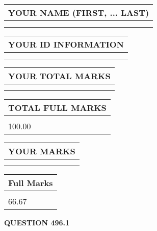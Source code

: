\documentclass{ctexart}
\begin{document}
   
   
   
\newpage 
\setcounter{page}{ 
   496001 } 
   
   
   
   
\noindent\begin{tabular}{|l|}
\hline
YOUR NAME (FIRST, ... LAST)  \\
\hline
 \\ 
 \\ 
\hline
\end{tabular}
\hspace{0.05in} \begin{tabular}{|l|}
\hline
 YOUR   ID   INFORMATION  \\
\hline
 \\ 
 \\ 
\hline
\end{tabular}
   
   
\vspace{0.2in}\noindent\begin{tabular}{|l|}
\hline
YOUR TOTAL MARKS  \\
\hline
 \\ 
 \\ 
\hline
\end{tabular}
\hspace{0.05in} \begin{tabular}{|l|}
\hline
TOTAL FULL MARKS  \\
\hline
 \\ 
100.00 \\
\hline
\end{tabular}
   
   
 \vspace{0.2in}
 
 
 
 
   
   
  
\vspace{0.2in}
  
\noindent\begin{tabular}{|l|}
\hline
 YOUR MARKS  \\
\hline
 \\ 
 \\ 
\hline
\end{tabular}
\hspace{0.05in} \begin{tabular}{|l|}
\hline
 Full Marks  \\
\hline
 \\ 
66.67 \\
\hline
\end{tabular}
{\textbf{\Large{QUESTION
496.1 
}}}
  
\end{document}
